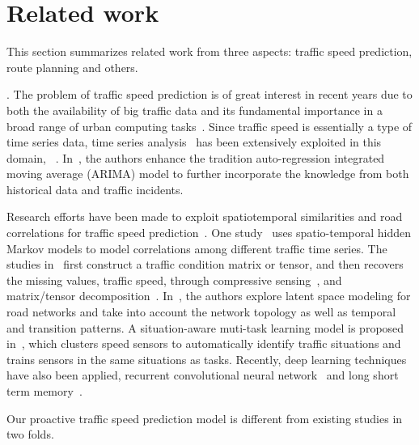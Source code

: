 \section{Related work}
\label{sec-related}

This section summarizes related work from three aspects: traffic speed prediction, route planning and others.

. The problem of traffic speed prediction is of great interest in recent years due to both the availability of big traffic data and its fundamental importance in a broad range of urban computing tasks~\cite{Zheng2014TIST}.
%
Since traffic speed is essentially a type of time series data, time series analysis~\cite{time-series-book} has been extensively exploited in this domain, \eg~\cite{traffic2011TRP,TS2012ICDM,HMM2013VLDB,MTL2017ICDM}. In~\cite{TS2012ICDM}, the authors enhance the tradition auto-regression integrated moving average (ARIMA) model to further incorporate the knowledge from both historical data and traffic incidents.

Research efforts have been made to exploit spatiotemporal similarities and road correlations for traffic speed prediction~\cite{Zhu2013TMC,Shang2014KDD,Wang2014KDD,LSM2016KDD,MTL2017ICDM,HMM2013VLDB}.
%
One study~\cite{HMM2013VLDB} uses spatio-temporal hidden Markov models to model correlations among different traffic time series.
%
The studies in~\cite{Zhu2013TMC,Shang2014KDD,Wang2014KDD} first construct a traffic condition matrix or tensor, and then recovers the missing values, \ie traffic speed, through compressive sensing~\cite{Zhu2013TMC}, and matrix/tensor decomposition~\cite{Shang2014KDD,Wang2014KDD}.
%
In~\cite{LSM2016KDD}, the authors explore latent space modeling for road networks and take  into account the network topology as well as temporal and transition patterns.
%
A situation-aware muti-task learning model is proposed in~\cite{MTL2017ICDM}, which clusters speed sensors to automatically identify traffic situations and trains sensors in the same situations as tasks.
%
Recently, deep learning techniques have also been applied, \eg recurrent convolutional neural network~\cite{DL2016ICDM} and long short term memory~\cite{DL2017SDM}.

Our proactive traffic speed prediction model is different from existing studies in two folds. 


